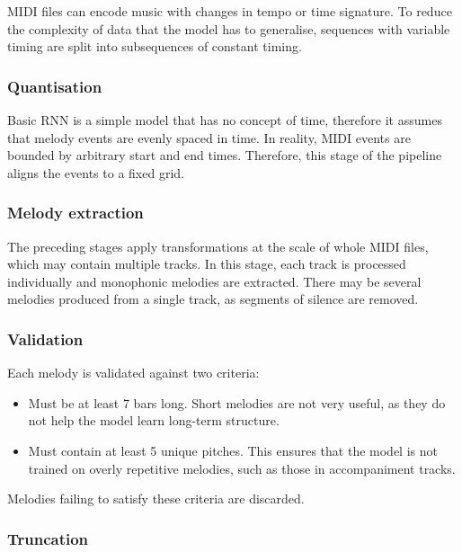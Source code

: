 \documentclass[../../report.tex]{subfiles}
\begin{document}
MIDI files can encode music with changes in tempo or time signature. To reduce
the complexity of data that the model has to generalise, sequences with variable
timing are split into subsequences of constant timing.


\subsubsection{Quantisation}

Basic RNN is a simple model that has no concept of time, therefore it assumes
that melody events are evenly spaced in time. In reality, MIDI events are
bounded by arbitrary start and end times. Therefore, this stage of the pipeline
aligns the events to a fixed grid.


\subsubsection{Melody extraction}

The preceding stages apply transformations at the scale of whole MIDI files,
which may contain multiple tracks. In this stage, each track is processed
individually and monophonic melodies are extracted. There may be several
melodies produced from a single track, as segments of silence are removed.

\subsubsection{Validation}

Each melody is validated against two criteria:

\begin{itemize}
  \item Must be at least 7 bars long. Short melodies are not very useful, as
  they do not help the model learn long-term structure.

  \item Must contain at least 5 unique pitches. This ensures that the model is
  not trained on overly repetitive melodies, such as those in accompaniment
  tracks.
\end{itemize}

Melodies failing to satisfy these criteria are discarded.

\subsubsection{Truncation}
\end{document}

